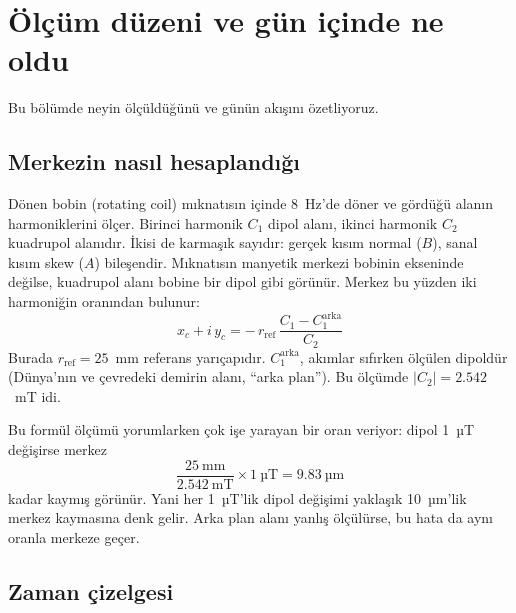 \documentclass[11pt,a4paper]{article}
\begin{document}
\section{Ölçüm düzeni ve gün içinde ne oldu}

Bu bölümde neyin ölçüldüğünü ve günün akışını özetliyoruz.

\subsection{Merkezin nasıl hesaplandığı}
Dönen bobin (rotating coil) mıknatısın içinde 8~Hz'de döner ve gördüğü alanın harmoniklerini ölçer.
Birinci harmonik $C_1$ dipol alanı, ikinci harmonik $C_2$ kuadrupol alanıdır. İkisi de karmaşık sayıdır:
gerçek kısım normal ($B$), sanal kısım skew ($A$) bileşendir. Mıknatısın manyetik merkezi bobinin
ekseninde değilse, kuadrupol alanı bobine bir dipol gibi görünür. Merkez bu yüzden iki harmoniğin oranından
bulunur:
\begin{equation}
  x_c + i\,y_c = -\,r_\text{ref}\,\frac{C_1 - C_1^\text{arka}}{C_2}
  \label{eq:merkez}
\end{equation}
Burada $r_\text{ref} = 25$~mm referans yarıçapıdır. $C_1^\text{arka}$, akımlar sıfırken ölçülen dipoldür
(Dünya'nın ve çevredeki demirin alanı, ``arka plan''). Bu ölçümde $|C_2| = 2.542$~mT idi.

Bu formül ölçümü yorumlarken çok işe yarayan bir oran veriyor: dipol 1~µT değişirse merkez
\[
  \frac{25\ \text{mm}}{2.542\ \text{mT}} \times 1\ \text{µT} = 9.83\ \text{µm}
\]
kadar kaymış görünür. Yani her 1~µT'lik dipol değişimi yaklaşık 10~µm'lik merkez kaymasına denk gelir.
Arka plan alanı yanlış ölçülürse, bu hata da aynı oranla merkeze geçer.

\subsection{Zaman çizelgesi}
\end{document}

